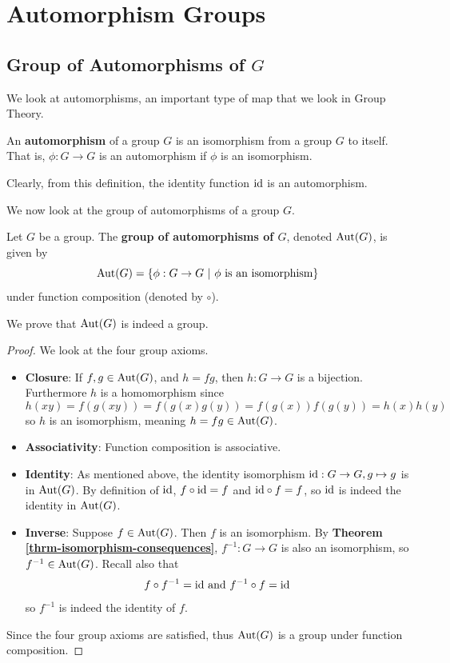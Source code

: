 \section{Automorphism Groups}
\subsection{Group of Automorphisms of \texorpdfstring{$G$}{G}}
We look at automorphisms, an important type of map that we look in Group Theory.
\begin{definition}
    An \textbf{automorphism} of a group $G$ is an isomorphism from a group $G$ to itself. That is, $\phi: G \to G$ is an automorphism if $\phi$ is an isomorphism.
\end{definition}
Clearly, from this definition, the identity function $\mathrm{id}$ is an automorphism.

We now look at the group of automorphisms of a group $G$.
\begin{definition}
    Let $G$ be a group. The \textbf{group of automorphisms of $G$}, denoted $\mathrm{Aut}(G)$, is given by
    \[
        \mathrm{Aut}(G) = \{\phi: G \to G \ | \ \phi \text{ is an isomorphism}\}
    \]
    under function composition (denoted by $\circ$).
\end{definition}
We prove that $\mathrm{Aut}(G)$ is indeed a group.
\begin{proof}
    We look at the four group axioms.
    \begin{itemize}
        \item \textbf{Closure}: If $f, g \in \mathrm{Aut}(G)$, and $h = fg$, then $h: G \to G$ is a bijection. Furthermore $h$ is a homomorphism since
        \[
            h(xy) = f(g(xy)) = f(g(x)g(y)) = f(g(x))f(g(y)) = h(x)h(y)
        \]
        so $h$ is an isomorphism, meaning $h = fg \in \mathrm{Aut}(G)$.

        \item \textbf{Associativity}: Function composition is associative.

        \item \textbf{Identity}: As mentioned above, the identity isomorphism $\mathrm{id}: G \to G, g \mapsto g$ is in $\mathrm{Aut}(G)$. By definition of $\mathrm{id}$, $f \circ \mathrm{id} = f$ and $\mathrm{id} \circ f = f$, so $\mathrm{id}$ is indeed the identity in $\mathrm{Aut}(G)$.

        \item \textbf{Inverse}: Suppose $f \in \mathrm{Aut}(G)$. Then $f$ is an isomorphism. By \textbf{Theorem \ref{thrm-isomorphism-consequences}}, $f^{-1}: G \to G$ is also an isomorphism, so $f^{-1} \in \mathrm{Aut}(G)$. Recall also that
        \[
            f\circ f^{-1} = \mathrm{id} \text{ and } f^{-1}\circ f = \mathrm{id}
        \]
        so $f^{-1}$ is indeed the identity of $f$.
    \end{itemize}
    Since the four group axioms are satisfied, thus $\mathrm{Aut}(G)$ is a group under function composition.
\end{proof}

